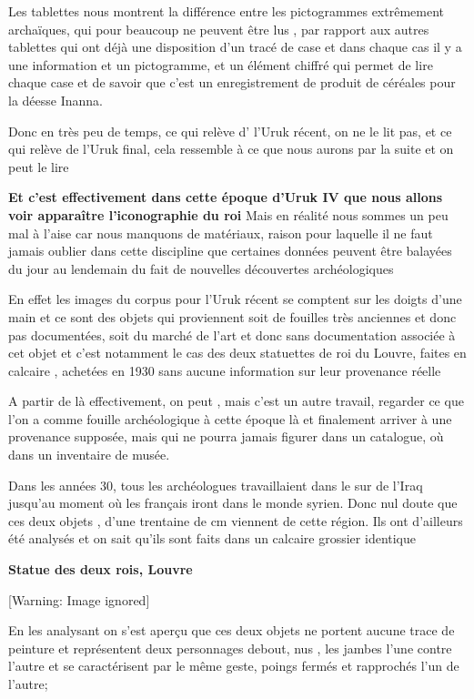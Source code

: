 \documentclass[a4paper,10pt]{article}
\begin{document}
\begin{itemize}
Les tablettes nous montrent la différence entre les pictogrammes
extrêmement archaïques, qui pour beaucoup ne peuvent être lus , par
rapport aux autres tablettes qui ont déjà une disposition
d'un tracé de case et dans chaque cas il y a une
information et un pictogramme,  et un élément chiffré qui  permet de
lire chaque case et de savoir que c'est un
enregistrement de produit de céréales pour la déesse Inanna.

Donc en très peu de temps, ce qui relève d'
l'Uruk récent, on ne le lit pas, et ce qui relève de
l'Uruk final, cela ressemble à ce que nous aurons par
la suite et on peut le lire

\textbf{Et c'est effectivement dans cette époque
d'Uruk IV que nous allons voir apparaître
l'iconographie du roi} Mais en réalité nous sommes un
peu mal à l'aise car nous manquons de matériaux,
raison pour laquelle il ne faut jamais oublier dans cette discipline
que certaines données peuvent être balayées du jour au lendemain du
fait de nouvelles découvertes archéologiques

En effet les images du corpus pour l'Uruk récent se
comptent sur les doigts d'une main et ce sont des
objets qui proviennent soit de fouilles très anciennes et donc pas
documentées, soit du marché de l'art et donc sans
documentation associée à cet objet et c'est notamment
le cas des deux statuettes de roi du Louvre, faites en calcaire ,
achetées en 1930 sans aucune information sur leur provenance réelle

A partir de là effectivement, on peut , mais c'est un
autre travail, regarder ce que l'on a comme fouille
archéologique à cette époque là et finalement arriver à une provenance
supposée, mais qui ne pourra jamais figurer dans un catalogue, où dans
un inventaire de musée.

Dans les années 30, tous les archéologues travaillaient dans le sur de
l'Iraq jusqu'au moment où les
français iront dans le monde syrien. Donc nul doute que ces deux objets
, d'une trentaine de cm viennent de cette région. Ils
ont d'ailleurs été analysés et on sait
qu'ils sont faits dans un calcaire grossier identique

\textbf{Statue des deux rois, Louvre}

  [Warning: Image ignored] %
 

En les analysant on s'est aperçu que ces deux objets ne
portent aucune trace de peinture et représentent deux personnages
debout, nus , les jambes l'une contre
l'autre et se caractérisent par le même geste,  poings
fermés et rapprochés l'un de l'autre;



\end{itemize}
\end{document}
